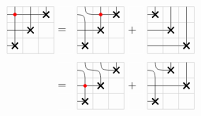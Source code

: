 \begin{align*}
    \begin{tikzpicture}[scale=0.5]
        \draw[black!20] (0,0) grid (3,3);
        \Xmarking{1}{1}\Xmarking{2}{2}\Xmarking{3}{3}
        \Cross{1}{2}\Cross{1}{3}\Cross{2}{3}
            \node[circle, fill=red, draw=red, scale=0.3] at (0.5,2.5) {};
    \end{tikzpicture}
  &\begin{tikzpicture}[scale=0.5]
        \draw[white!20] (0,0) grid (1,3);
        \node[text width=0.5cm] at (0.5, 1.5) {$=$};
        \end{tikzpicture}
    \begin{tikzpicture}[scale=0.5]
        \draw[black!20] (0,0) grid (3,3);
        \Xmarking{1}{1}\Xmarking{2}{2}\Xmarking{3}{3}
        \Cross{1}{2}\Asmooth{1}{3}\Cross{2}{3}
            \node[circle, fill=red, draw=red, scale=0.3] at (1.5,2.5) {};
    \end{tikzpicture}
    \begin{tikzpicture}[scale=0.5]
        \draw[white!20] (0,0) grid (1,3);
        \node[text width=0.5cm] at (0.5, 1.5) {$+$};
        \end{tikzpicture}
    \begin{tikzpicture}[scale=0.5]
        \draw[black!20] (0,0) grid (3,3);
        \Xmarking{1}{3}\Xmarking{2}{2}\Xmarking{3}{1}
        \UP{2}{3}\EAST{1}{2}\UP{3}{2}\UP{3}{3}\EAST{1}{1}\EAST{2}{1}
    \end{tikzpicture}\\
    &\begin{tikzpicture}[scale=0.5]
        \draw[white!20] (0,0) grid (1,3);
        \node[text width=0.5cm] at (0.5, 1.5) {$=$};
        \end{tikzpicture}\begin{tikzpicture}[scale=0.5]
        \draw[black!20] (0,0) grid (3,3);
        \Xmarking{1}{1}\Xmarking{2}{2}\Xmarking{3}{3}
        \Cross{1}{2}\Asmooth{1}{3}\Asmooth{2}{3}
            \node[circle, fill=red, draw=red, scale=0.3] at (0.5,1.5) {};
    \end{tikzpicture}
        \begin{tikzpicture}[scale=0.5]
        \draw[white!20] (0,0) grid (1,3);
        \node[text width=0.5cm] at (0.5, 1.5) {$+$};
        \end{tikzpicture}
            \begin{tikzpicture}[scale=0.5]
        \draw[black!20] (0,0) grid (3,3);
        \Xmarking{1}{1}\Xmarking{2}{3}\Xmarking{3}{2}
        \Cross{1}{2}\Asmooth{1}{3}\EAST{2}{2}\UP{3}{3}

\end{tikzpicture}
\end{align*}
